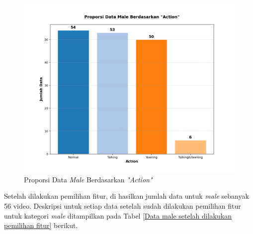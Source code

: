      \begin{figure}[H]
             \centering
         \includegraphics[width=0.75\linewidth]{figures/bab4/data_male.png}
         \caption{Proporsi Data \textit{Male} Berdasarkan \textit{"Action"}}
         \label{Proporsi Data Male Berdasarkan "Action"}
     \end{figure}

  


    Setelah dilakukan pemilihan fitur, di hasilkan jumlah data 
    untuk \textit{male} sebanyak 56 video. Deskripsi untuk setiap data setelah sudah dilakukan pemilihan fitur untuk kategori \textit{male} ditampilkan pada Tabel \ref{Data male setelah dilakukan pemilihan fitur} berikut.

